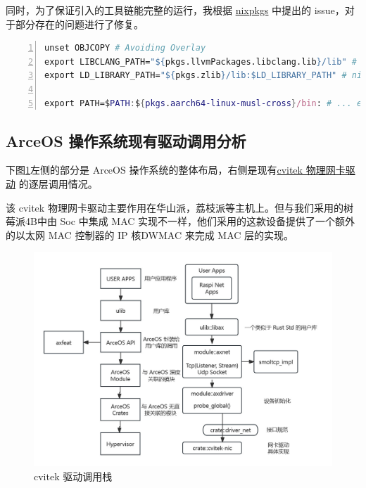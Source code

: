     同时，为了保证引入的工具链能完整的运行，我根据 \href{}{nixpkgs} 中提出的 issue，对于部分存在的问题进行了修复。

    \begin{lstlisting}[language=nix
        , caption=flakes 特殊适配
        , numbers = left
        , breaklines=true
        , breakatwhitespace=true]
unset OBJCOPY # Avoiding Overlay
export LIBCLANG_PATH="${pkgs.llvmPackages.libclang.lib}/lib" # nixpkgs@52447
export LD_LIBRARY_PATH="${pkgs.zlib}/lib:$LD_LIBRARY_PATH" # nixpkgs@92946

export PATH=$PATH:${pkgs.aarch64-linux-musl-cross}/bin: # ... etc
    \end{lstlisting}



\subsection{ArceOS 操作系统现有驱动调用分析}

    下图\ref{fig::cvitek}左侧的部分是 ArceOS 操作系统的整体布局，右侧是现有\href{https://github.com/yuoo655/arceos_net/tree/hsp}{cvitek 物理网卡驱动} 的逐层调用情况。

    该 cvitek 物理网卡驱动主要作用在华山派，荔枝派等主机上。但与我们采用的树莓派4B中由 Soc 中集成 MAC 实现不一样，他们采用的这款设备提供了一个额外的以太网 MAC 控制器的 IP 核DWMAC 来完成 MAC 层的实现。

        
    \begin{figure}[ht]
        \centering
        \includegraphics[scale=0.4]{imgs/cvitek.jpg}
        \caption{cvitek 驱动调用栈}    \label{fig::cvitek}
    \end{figure}

